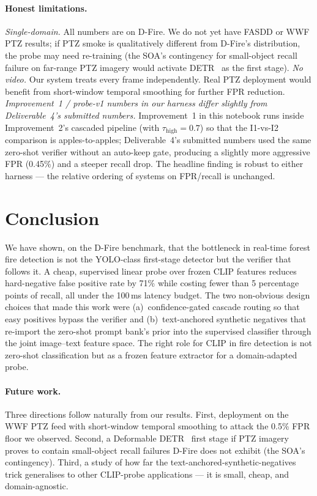 \documentclass{article}
\begin{document}
\paragraph{Honest limitations.}
\emph{Single-domain.} All numbers are on D-Fire. We do not yet have FASDD or
WWF PTZ results; if PTZ smoke is qualitatively different from D-Fire's
distribution, the probe may need re-training (the SOA's contingency for
small-object recall failure on far-range PTZ imagery would activate
DETR~\cite{carion2020detr} as the first stage). \emph{No video.} Our system
treats every frame independently. Real PTZ deployment would benefit from
short-window temporal smoothing for further FPR reduction.
\emph{Improvement~1 / probe-v1 numbers in our harness differ slightly from
Deliverable~4's submitted numbers.} Improvement~1 in this notebook runs
inside Improvement~2's cascaded pipeline (with $\tau_{\text{high}}{=}0.7$) so
that the I1-vs-I2 comparison is apples-to-apples; Deliverable~4's submitted
numbers used the same zero-shot verifier without an auto-keep gate,
producing a slightly more aggressive FPR (0.45\%) and a steeper recall drop.
The headline finding is robust to either harness --- the relative ordering of
systems on FPR/recall is unchanged.

\section{Conclusion}
\label{sec:conclusion}

We have shown, on the D-Fire benchmark, that the bottleneck in real-time
forest fire detection is not the YOLO-class first-stage detector but the
verifier that follows it. A cheap, supervised linear probe over frozen CLIP
features reduces hard-negative false positive rate by 71\% while costing
fewer than 5 percentage points of recall, all under the 100\,ms latency
budget. The two non-obvious design choices that made this work were
(a)~confidence-gated cascade routing so that easy positives bypass the
verifier and (b)~text-anchored synthetic negatives that re-import the
zero-shot prompt bank's prior into the supervised classifier through the
joint image--text feature space. The right role for CLIP in fire detection
is not zero-shot classification but as a frozen feature extractor for a
domain-adapted probe.

\paragraph{Future work.} Three directions follow naturally from our results.
First, deployment on the WWF PTZ feed with short-window temporal smoothing
to attack the 0.5\% FPR floor we observed. Second, a Deformable
DETR~\cite{carion2020detr} first stage if PTZ imagery proves to contain
small-object recall failures D-Fire does not exhibit (the SOA's contingency).
Third, a study of how far the text-anchored-synthetic-negatives trick
generalises to other CLIP-probe applications --- it is small, cheap, and
domain-agnostic.
\end{document}
